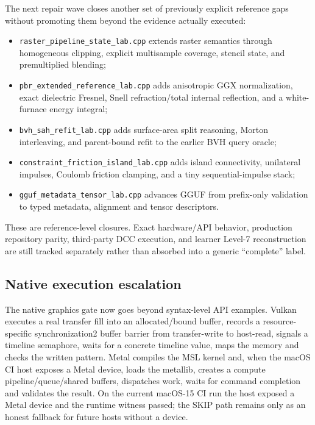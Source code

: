 \hypertarget{appendix-2358b21a702d-third-wave-closure-pipeline-state-spatial-quality-solver-coupling-and-model-containers}{}

The next repair wave closes another set of previously explicit reference gaps without promoting them beyond the evidence actually executed:

\begin{itemize}
\tightlist
\item
  \texttt{raster\_pipeline\_state\_lab.cpp} extends raster semantics through homogeneous clipping, explicit multisample coverage, stencil state, and premultiplied blending;
\item
  \texttt{pbr\_extended\_reference\_lab.cpp} adds anisotropic GGX normalization, exact dielectric Fresnel, Snell refraction/total internal reflection, and a white-furnace energy integral;
\item
  \texttt{bvh\_sah\_refit\_lab.cpp} adds surface-area split reasoning, Morton interleaving, and parent-bound refit to the earlier BVH query oracle;
\item
  \texttt{constraint\_friction\_island\_lab.cpp} adds island connectivity, unilateral impulses, Coulomb friction clamping, and a tiny sequential-impulse stack;
\item
  \texttt{gguf\_metadata\_tensor\_lab.cpp} advances GGUF from prefix-only validation to typed metadata, alignment and tensor descriptors.
\end{itemize}

These are reference-level closures. Exact hardware/API behavior, production repository parity, third-party DCC execution, and learner Level-7 reconstruction are still tracked separately rather than absorbed into a generic ``complete'' label.

\subsection{Native execution escalation}\label{appendix-2358b21a702d-native-execution-escalation}

\hypertarget{appendix-2358b21a702d-native-execution-escalation}{}

The native graphics gate now goes beyond syntax-level API examples. Vulkan executes a real transfer fill into an allocated/bound buffer, records a resource-specific synchronization2 buffer barrier from transfer-write to host-read, signals a timeline semaphore, waits for a concrete timeline value, maps the memory and checks the written pattern. Metal compiles the MSL kernel and, when the macOS CI host exposes a Metal device, loads the metallib, creates a compute pipeline/queue/shared buffers, dispatches work, waits for command completion and validates the result. On the current macOS-15 CI run the host exposed a Metal device and the runtime witness passed; the SKIP path remains only as an honest fallback for future hosts without a device.

